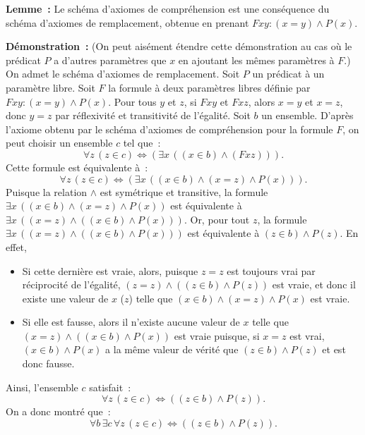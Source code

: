 \medskip

\noindent\textbf{Lemme :} Le schéma d'axiomes de compréhension est une conséquence du schéma d'axiomes de remplacement, obtenue en prenant $F x y : (x = y) \wedge P(x)$. 

\medskip

\noindent\textbf{Démonstration :} 
    (On peut aisément étendre cette démonstration au cas où le prédicat $P$ a d'autres paramètres que $x$ en ajoutant les mêmes paramètres à $F$.)
    On admet le schéma d'axiomes de remplacement. 
    Soit $P$ un prédicat à un paramètre libre. 
    Soit $F$ la formule à deux paramètres libres définie par $F x y : (x = y) \wedge P(x)$. 
    Pour tous $y$ et $z$, si $F x y$ et $F x z$, alors $x = y$ et $x = z$, donc $y = z$ par réflexivité et transitivité de l'égalité.
    Soit $b$ un ensemble. 
    D'après l'axiome obtenu par le schéma d'axiomes de compréhension pour la formule $F$, on peut choisir un ensemble $c$ tel que : 
    \begin{equation*}
        \forall z \, (z \in c) \Leftrightarrow \left( \exists x \, ((x \in b) \wedge (F x z)) \right). 
    \end{equation*}
    Cette formule est équivalente à : 
    \begin{equation*}
        \forall z \, (z \in c) \Leftrightarrow \left( \exists x \, ((x \in b) \wedge (x = z) \wedge P(x)) \right). 
    \end{equation*}
    Puisque la relation $\wedge$ est symétrique et transitive, la formule $\exists x \, ((x \in b) \wedge (x = z) \wedge P(x))$ est équivalente à $\exists x \, ((x = z) \wedge  ((x \in b) \wedge P(x)))$.
    Or, pour tout $z$, la formule $\exists x \, ((x = z) \wedge ((x \in b) \wedge P(x)))$ est équivalente à $(z \in b) \wedge P(z)$.
    En effet, 
    \begin{itemize}[nosep]
        \item Si cette dernière est vraie, alors, puisque $z = z$ est toujours vrai par réciprocité de l'égalité, $(z = z) \wedge ((z \in b) \wedge P(z))$ est vraie, et donc il existe une valeur de $x$ ($z$) telle que $(x \in b) \wedge (x = z) \wedge P(x)$ est vraie. 
        \item Si elle est fausse, alors il n'existe aucune valeur de $x$ telle que $(x = z) \wedge ((x \in b) \wedge P(x))$ est vraie puisque, si $x = z$ est vrai, $(x \in b) \wedge P(x)$ a la même valeur de vérité que $(z \in b) \wedge P(z)$ et est donc fausse.
    \end{itemize}
    Ainsi, l'ensemble $c$ satisfait : 
    \begin{equation*}
        \forall z \, (z \in c) \Leftrightarrow \left( (z \in b) \wedge P(z) \right). 
    \end{equation*}
    On a donc montré que :
    \begin{equation*}
        \forall b \, \exists c \, \forall z \, (z \in c) \Leftrightarrow \left( (z \in b) \wedge P(z) \right). 
    \end{equation*}

